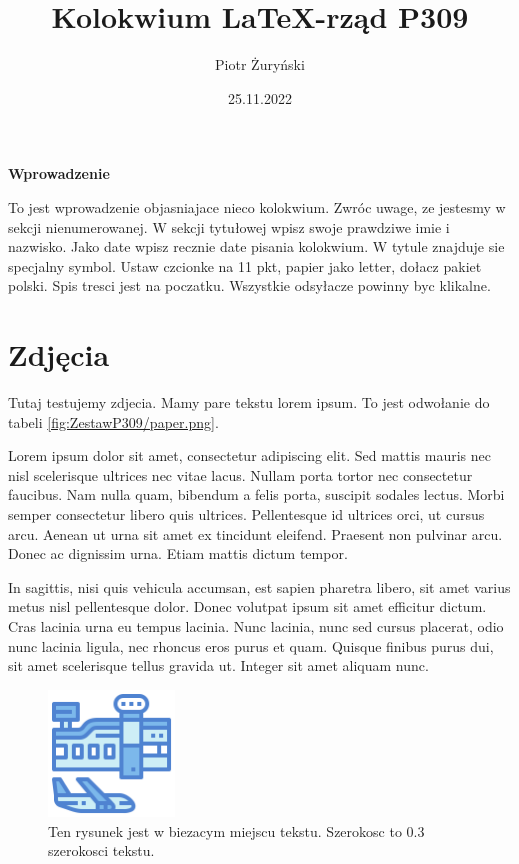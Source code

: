 \documentclass[11pt,a4paper]{article}
\title{Kolokwium \LaTeX-rząd P309}
\author{Piotr Żuryński}
\date{25.11.2022}
\begin{document}
\maketitle
\tableofcontents
\begin{flushleft}
\textbf{\large{Wprowadzenie}}\\
\end{flushleft}
To jest wprowadzenie objasniajace nieco kolokwium. Zwróc uwage, ze jestesmy
w sekcji nienumerowanej. W sekcji tytułowej wpisz swoje prawdziwe
imie i nazwisko. Jako date wpisz recznie date pisania kolokwium. W tytule
znajduje sie specjalny symbol. Ustaw czcionke na 11 pkt, papier jako letter,
dołacz pakiet polski. Spis tresci jest na poczatku. Wszystkie odsyłacze
powinny byc klikalne.

\section{Zdjęcia}
 Tutaj testujemy zdjecia. Mamy pare tekstu lorem ipsum. To jest odwołanie do tabeli \ref{fig:ZestawP309/paper.png}.

Lorem ipsum dolor sit amet, consectetur adipiscing elit. Sed mattis mauris
nec nisl scelerisque ultrices nec vitae lacus. Nullam porta tortor nec consectetur
faucibus. Nam nulla quam, bibendum a felis porta, suscipit sodales
lectus. Morbi semper consectetur libero quis ultrices. Pellentesque id ultrices
orci, ut cursus arcu. Aenean ut urna sit amet ex tincidunt eleifend. Praesent
non pulvinar arcu. Donec ac dignissim urna. Etiam mattis dictum tempor.\par
\newpage
\raggedright
In sagittis, nisi quis vehicula accumsan, est sapien pharetra libero, sit amet
varius metus nisl pellentesque dolor. Donec volutpat ipsum sit amet efficitur
dictum. Cras lacinia urna eu tempus lacinia. Nunc lacinia, nunc sed cursus
placerat, odio nunc lacinia ligula, nec rhoncus eros purus et quam. Quisque
finibus purus dui, sit amet scelerisque tellus gravida ut. Integer sit amet
aliquam nunc.

\begin{figure}[h]
\includegraphics[width=0.3\textwidth]{ZestawP309/airport.png} 
\centering
\caption{Ten rysunek jest w biezacym miejscu tekstu. Szerokosc to 0.3
szerokosci tekstu.}
\label{fig:ZestawP309/airport.png}
\end{figure}
\end{document}
